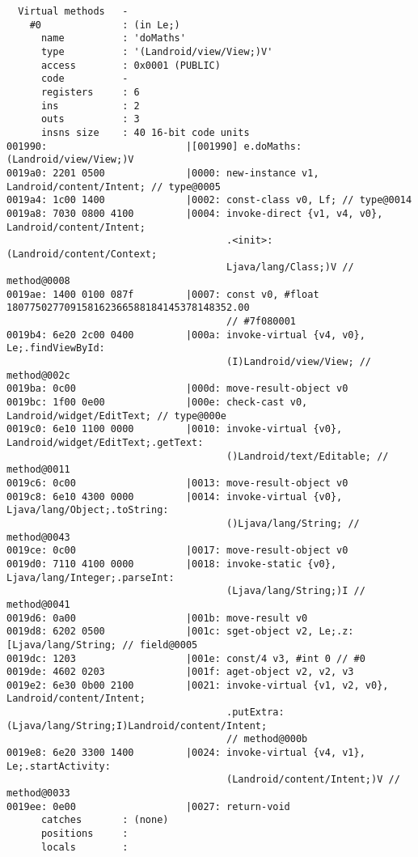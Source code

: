 \begin{lstlisting}
  Virtual methods   -
    #0              : (in Le;)
      name          : 'doMaths'
      type          : '(Landroid/view/View;)V'
      access        : 0x0001 (PUBLIC)
      code          -
      registers     : 6
      ins           : 2
      outs          : 3
      insns size    : 40 16-bit code units
001990:                        |[001990] e.doMaths:(Landroid/view/View;)V
0019a0: 2201 0500              |0000: new-instance v1, Landroid/content/Intent; // type@0005
0019a4: 1c00 1400              |0002: const-class v0, Lf; // type@0014
0019a8: 7030 0800 4100         |0004: invoke-direct {v1, v4, v0}, Landroid/content/Intent;
                                      .<init>:(Landroid/content/Context;
                                      Ljava/lang/Class;)V // method@0008
0019ae: 1400 0100 087f         |0007: const v0, #float 180775027709158162366588184145378148352.00
                                      // #7f080001
0019b4: 6e20 2c00 0400         |000a: invoke-virtual {v4, v0}, Le;.findViewById:
                                      (I)Landroid/view/View; // method@002c
0019ba: 0c00                   |000d: move-result-object v0
0019bc: 1f00 0e00              |000e: check-cast v0, Landroid/widget/EditText; // type@000e
0019c0: 6e10 1100 0000         |0010: invoke-virtual {v0}, Landroid/widget/EditText;.getText:
                                      ()Landroid/text/Editable; // method@0011
0019c6: 0c00                   |0013: move-result-object v0
0019c8: 6e10 4300 0000         |0014: invoke-virtual {v0}, Ljava/lang/Object;.toString:
                                      ()Ljava/lang/String; // method@0043
0019ce: 0c00                   |0017: move-result-object v0
0019d0: 7110 4100 0000         |0018: invoke-static {v0}, Ljava/lang/Integer;.parseInt:
                                      (Ljava/lang/String;)I // method@0041
0019d6: 0a00                   |001b: move-result v0
0019d8: 6202 0500              |001c: sget-object v2, Le;.z:[Ljava/lang/String; // field@0005
0019dc: 1203                   |001e: const/4 v3, #int 0 // #0
0019de: 4602 0203              |001f: aget-object v2, v2, v3
0019e2: 6e30 0b00 2100         |0021: invoke-virtual {v1, v2, v0}, Landroid/content/Intent;
                                      .putExtra:(Ljava/lang/String;I)Landroid/content/Intent;
                                      // method@000b
0019e8: 6e20 3300 1400         |0024: invoke-virtual {v4, v1}, Le;.startActivity:
                                      (Landroid/content/Intent;)V // method@0033
0019ee: 0e00                   |0027: return-void
      catches       : (none)
      positions     :
      locals        :


\end{lstlisting}
